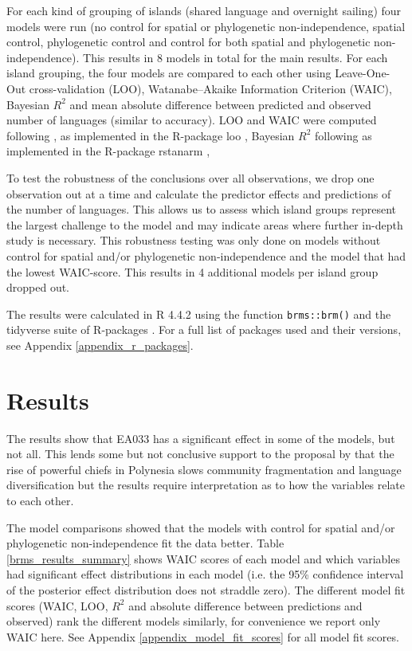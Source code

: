 \documentclass[unnumsec,webpdf,modern,medium]{oup-authoring-template}
\begin{document}
For each kind of grouping of islands (shared language and overnight sailing) four models were run (no control for spatial or phylogenetic non-independence, spatial control, phylogenetic control and control for both spatial and phylogenetic non-independence). This results in 8 models in total for the main results. For each island grouping, the four models are compared to each other using Leave-One-Out cross-validation (LOO), Watanabe–Akaike Information Criterion (WAIC), Bayesian $R^2$ and mean absolute difference between predicted and observed number of languages (similar to accuracy). LOO and WAIC were computed following  \citet{vehtari2017practical}, as implemented in the R-package loo \citep{R-loo}, Bayesian $R^2$ following \citet{gelman2019r} as implemented in the R-package rstanarm \citep{R-rstanarm},

To test the robustness of the conclusions over all observations, we drop one observation out at a time and calculate the predictor effects and predictions of the number of languages. This allows us to assess which island groups represent the largest challenge to the model and may indicate areas where further in-depth study is necessary. This robustness testing was only done on models without control for spatial and/or phylogenetic non-independence and the model that had the lowest WAIC-score. This results in 4 additional models per island group dropped out.

The results were calculated in R 4.4.2 \citep{R} using the function \texttt{brms::brm()} \citep{burkner2017brms} and the tidyverse suite of R-packages \citep{tidyverse13}. For a full list of packages used and their versions, see Appendix \ref{appendix_r_packages}.

\FloatBarrier
\section{Results}
The results show that EA033 has a significant effect in some of the models, but not all. This lends some but not conclusive support to the proposal by \citet{pawley81, pawley2007} that the rise of powerful chiefs in Polynesia slows community fragmentation and language diversification but the results require interpretation as to how the variables relate to each other. 


The model comparisons showed that the models with control for spatial and/or phylogenetic non-independence fit the data better. Table \ref{brms_results_summary} shows WAIC scores of each model and which variables had significant effect distributions in each model (i.e. the 95\% confidence interval of the posterior effect distribution does not straddle zero). The different model fit scores (WAIC, LOO,  $R^2$ and absolute difference between predictions and observed) rank the different models similarly, for convenience we report only WAIC here. See Appendix \ref{appendix_model_fit_scores} for all model fit scores.
\end{document}
